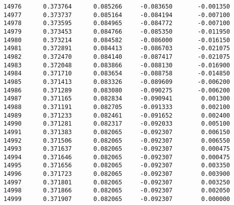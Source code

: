 \documentclass[11pt]{article}
\begin{document}
\begin{verbatim}
14976      0.373764      0.085266     -0.083650       -0.001350   
14977      0.373737      0.085164     -0.084194       -0.007100   
14978      0.373595      0.084965     -0.084772       -0.007100   
14979      0.373453      0.084766     -0.085350       -0.011950   
14980      0.373214      0.084582     -0.086000       -0.016150   
14981      0.372891      0.084413     -0.086703       -0.021075   
14982      0.372470      0.084140     -0.087417       -0.021075   
14983      0.372048      0.083866     -0.088130       -0.016900   
14984      0.371710      0.083654     -0.088758       -0.014850   
14985      0.371413      0.083326     -0.089609       -0.006200   
14986      0.371289      0.083080     -0.090275       -0.006200   
14987      0.371165      0.082834     -0.090941        0.001300   
14988      0.371191      0.082705     -0.091333        0.002100   
14989      0.371233      0.082461     -0.091652        0.002400   
14990      0.371281      0.082317     -0.092033        0.005100   
14991      0.371383      0.082065     -0.092307        0.006150   
14992      0.371506      0.082065     -0.092307        0.006550   
14993      0.371637      0.082065     -0.092307        0.000475   
14994      0.371646      0.082065     -0.092307        0.000475   
14995      0.371656      0.082065     -0.092307        0.003350   
14996      0.371723      0.082065     -0.092307        0.003900   
14997      0.371801      0.082065     -0.092307        0.003250   
14998      0.371866      0.082065     -0.092307        0.002050   
14999      0.371907      0.082065     -0.092307        0.000000   


\end{verbatim}
\end{document}
